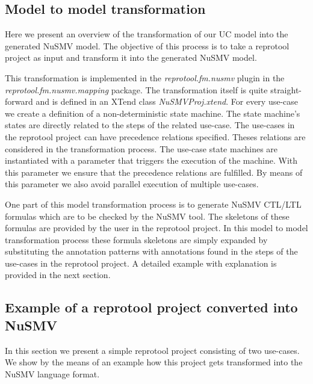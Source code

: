 \subsection{Model to model transformation}

Here we present an overview of the transformation of our UC model into the generated NuSMV model. The objective of this process is to
take a reprotool project as input and transform it into the generated NuSMV model.

This transformation is implemented in the \emph{reprotool.fm.nusmv} plugin in the \emph{reprotool.fm.nusmv.mapping} package.
The transformation itself is quite straight-forward and is defined in an XTend class \emph{NuSMVProj.xtend}.
For every use-case we create a definition of a non-deterministic state machine.
The state machine's states are directly related to the steps of the related use-case.
The use-cases in the reprotool project can have precedence relations specified. Theses relations are considered in the
transformation process. The use-case state machines are instantiated with a parameter that triggers the execution of the machine.
With this parameter we ensure that the precedence relations are fulfilled. By means of this parameter we also avoid parallel execution
of multiple use-cases.

One part of this model transformation process is to generate NuSMV CTL/LTL formulas which are to be checked by the NuSMV tool. The
skeletons of these formulas are provided by the user in the reprotool project. In this model to model transformation process these
formula skeletons are simply expanded by substituting the annotation patterns with annotations found in the steps of the use-cases
in the reprotool project. A detailed example with explanation is provided in the next section.

\subsection{Example of a reprotool project converted into NuSMV}

In this section we present a simple reprotool project consisting of two use-cases. We show by the means of an example how this project
gets transformed into the NuSMV language format.

